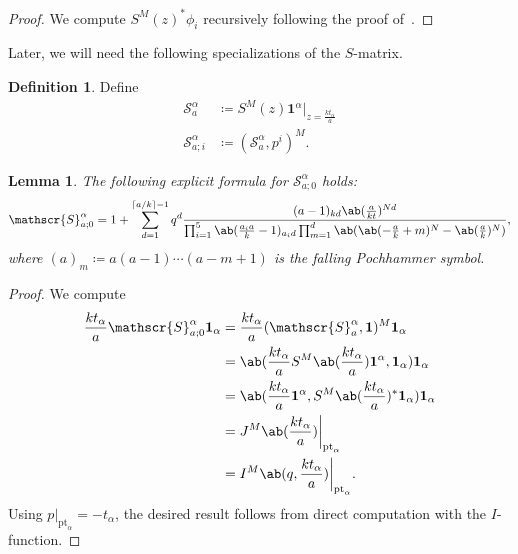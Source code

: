 \documentclass[10pt]{amsart}
\DeclarePairedDelimiter{\ceil}{\lceil}{\rceil}
\newtheorem{lem}[thm]{Lemma}
\theoremstyle{definition}
\newtheorem{defn}[thm]{Definition}
\theoremstyle{remark}
\theoremstyle{plain}
\theoremstyle{definition}
\theoremstyle{remark}
\newcommand{\msc}[1]{\mathscr{#1}}
\newcommand{\mbf}[1]{\mathbf{#1}}
\newcommand{\mr}[1]{\mathrm{#1}}
\newcommand{\1}{\mathbf{1}}
\newcommand{\2}{\mathbf{2}}
\newcommand{\3}{\mathbf{3}}
\newcommand{\pt}{\mr{pt}}
\numberwithin{equation}{section}
\begin{document}
\begin{proof}
    We compute $S^M(z)^* \phi_i$ recursively following the proof of~\cite[Lemma 1.12]{nmsp2}.
\end{proof}

Later, we will need the following specializations of the $S$-matrix.
\begin{defn}\label{defn:specializeds}
    Define
    \begin{align*}
        \msc{S}_a^{\alpha} &\coloneqq S^M(z) \mbf{1}^{\alpha}|_{z = \frac{k t_{\alpha}}{a}} \\
        \msc{S}_{a;i}^{\alpha} &\coloneqq (\msc{S}_a^{\alpha}, p^i)^M.
    \end{align*}
\end{defn}

\begin{lem}
    The following explicit formula for $\msc{S}_{a;0}^{\alpha}$ holds:
    \[ \msc{S}_{a;0}^{\alpha} = 1 + \sum_{d = 1}^{\ceil{a/k}-1} q^d \frac{(a-1)_{kd} \ab(\frac{a}{kt})^{Nd}}{\prod_{i=1}^5\ab(\frac{a_i a}{k}-1)_{a_i d} \prod_{m=1}^d \ab(\ab(-\frac{a}{k}+m)^N - \ab(\frac{a}{k})^N)} , \]
    where $(a)_m \coloneqq a(a-1) \cdots (a-m+1)$ is the falling Pochhammer symbol.
\end{lem}

\begin{proof}
    We compute
    \begin{align*}
        \frac{k t_{\alpha}}{a} \msc{S}_{a;0}^{\alpha} \mbf{1}_{\alpha} &= \frac{k t_{\alpha}}{a} (\msc{S}_a^{\alpha}, \mbf{1})^M \mbf{1}_{\alpha} \\
        &= \ab(\frac{k t_{\alpha}}{a} S^M\ab(\frac{kt_{\alpha}}{a}) \mbf{1}^{\alpha}, \mbf{1}_{\alpha}) \mbf{1}_{\alpha} \\
        &= \ab(\frac{k t_{\alpha}}{a} \1^{\alpha} , S^M\ab(\frac{kt_{\alpha}}{a})^* \mbf{1}_{\alpha}) \mbf{1}_{\alpha}  \\
        &= J^M\ab(\frac{kt_{\alpha}}{a}) \bigg|_{\pt_{\alpha}} \\
        &= I^M\ab(q, \frac{kt_{\alpha}}{a}) \bigg|_{\pt_{\alpha}}.
    \end{align*}
    Using $p|_{\pt_{\alpha}} = -t_{\alpha}$, the desired result follows from direct computation with the $I$-function.
\end{proof}
\end{document}
